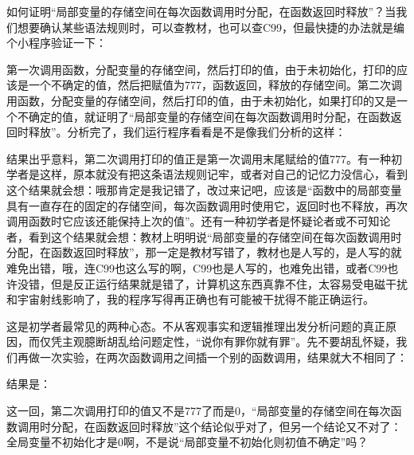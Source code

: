 如何证明“局部变量的存储空间在每次函数调用时分配，在函数返回时释放”？当我们想要确认某些语法规则时，可以查教材，也可以查C99，但最快捷的办法就是编个小程序验证一下：





第一次调用函数，分配变量的存储空间，然后打印的值，由于未初始化，打印的应该是一个不确定的值，然后把赋值为777，函数返回，释放的存储空间。第二次调用函数，分配变量的存储空间，然后打印的值，由于未初始化，如果打印的又是一个不确定的值，就证明了“局部变量的存储空间在每次函数调用时分配，在函数返回时释放”。分析完了，我们运行程序看看是不是像我们分析的这样：




结果出乎意料，第二次调用打印的值正是第一次调用末尾赋给的值777。有一种初学者是这样，原本就没有把这条语法规则记牢，或者对自己的记忆力没信心，看到这个结果就会想：哦那肯定是我记错了，改过来记吧，应该是“函数中的局部变量具有一直存在的固定的存储空间，每次函数调用时使用它，返回时也不释放，再次调用函数时它应该还能保持上次的值”。还有一种初学者是怀疑论者或不可知论者，看到这个结果就会想：教材上明明说“局部变量的存储空间在每次函数调用时分配，在函数返回时释放”，那一定是教材写错了，教材也是人写的，是人写的就难免出错，哦，连C99也这么写的啊，C99也是人写的，也难免出错，或者C99也许没错，但是反正运行结果就是错了，计算机这东西真靠不住，太容易受电磁干扰和宇宙射线影响了，我的程序写得再正确也有可能被干扰得不能正确运行。



这是初学者最常见的两种心态。不从客观事实和逻辑推理出发分析问题的真正原因，而仅凭主观臆断胡乱给问题定性，“说你有罪你就有罪”。先不要胡乱怀疑，我们再做一次实验，在两次函数调用之间插一个别的函数调用，结果就大不相同了：




结果是：




这一回，第二次调用打印的值又不是777了而是0，“局部变量的存储空间在每次函数调用时分配，在函数返回时释放”这个结论似乎对了，但另一个结论又不对了：全局变量不初始化才是0啊，不是说“局部变量不初始化则初值不确定”吗？



